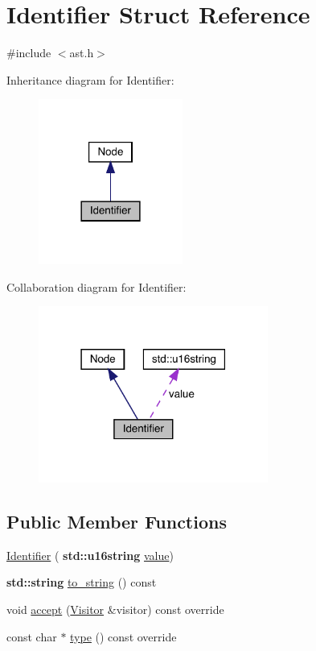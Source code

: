 \hypertarget{struct_identifier}{}\section{Identifier Struct Reference}
\label{struct_identifier}


{\ttfamily \#include $<$ast.\+h$>$}



Inheritance diagram for Identifier\+:\nopagebreak
\begin{figure}[H]
\begin{center}
\leavevmode
\includegraphics[width=134pt]{struct_identifier__inherit__graph}
\end{center}
\end{figure}


Collaboration diagram for Identifier\+:\nopagebreak
\begin{figure}[H]
\begin{center}
\leavevmode
\includegraphics[width=214pt]{struct_identifier__coll__graph}
\end{center}
\end{figure}
\subsection*{Public Member Functions}
\begin{DoxyCompactItemize}
\item 
\hyperlink{struct_identifier_a7b446d6b561512e0ee273f29b1e95581}{Identifier} (\textbf{ std\+::u16string} \hyperlink{struct_identifier_a1deb747305d88d9ccac5137a65838d63}{value})
\item 
\textbf{ std\+::string} \hyperlink{struct_identifier_a86c253d449b695548284efd85ec2be4e}{to\+\_\+string} () const
\item 
void \hyperlink{struct_identifier_acc1d00e56e626c8398b4e995578d6769}{accept} (\hyperlink{struct_visitor}{Visitor} \&visitor) const override
\item 
const char $\ast$ \hyperlink{struct_identifier_a8b4c74fe6ce48b6e13ae25dff7c60842}{type} () const override
\end{DoxyCompactItemize}
